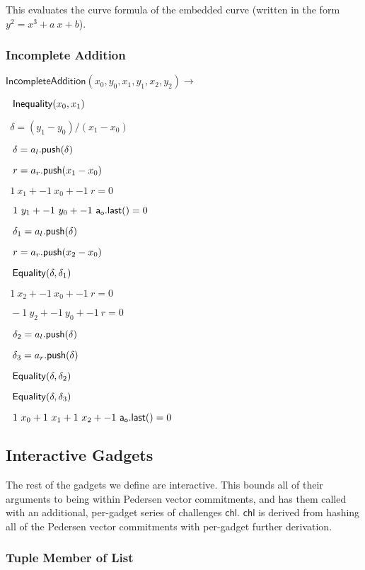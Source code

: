 \documentclass[]{article}
\begin{document}
This evaluates the curve formula of the embedded curve (written in the form $y^2 = x^3 + a ~x + b$).

\newpage

\subsubsection{Incomplete Addition}

\newcommand{\incompleteadd}{\mathsf{IncompleteAddition}}

$\incompleteadd(x_0, y_0, x_1, y_1, x_2, y_2) \rightarrow$

$~~\mathsf{Inequality}(x_0, x_1)$

$~~\delta = (y_1 - y_0) / (x_1 - x_0)$

$~~\delta = a_l\mathsf{.push}(\delta)$

$~~r = a_r\mathsf{.push}(x_1 - x_0)$

$~~1 ~x_1 + -1 ~x_0 + -1 ~r = 0$

$~~1 ~y_1 + -1 ~y_0 + -1 ~\mathsf{a_o.last()} = 0$

$~~\delta_1 = a_l\mathsf{.push}(\delta)$

$~~r = a_r\mathsf{.push}(x_2 - x_0)$

$~~\mathsf{Equality}(\delta, \delta_1)$

$~~1 ~x_2 + -1 ~x_0 + -1 ~r = 0$

$~~-1 ~y_2 + -1 ~y_0 + -1 ~r = 0$

$~~\delta_2 = a_l\mathsf{.push}(\delta)$

$~~\delta_3 = a_r\mathsf{.push}(\delta)$

$~~\mathsf{Equality}(\delta, \delta_2)$

$~~\mathsf{Equality}(\delta, \delta_3)$

$~~1 ~x_0 + 1 ~x_1 + 1 ~x_2 + -1 ~\mathsf{a_o.last()} = 0$

\newpage

\subsection{Interactive Gadgets}

\newcommand{\chl}{\mathsf{chl}}

The rest of the gadgets we define are interactive. This bounds all of their arguments to being within Pedersen vector commitments, and has them called with an additional, per-gadget series of challenges $\chl$. $\chl$ is derived from hashing all of the Pedersen vector commitments with per-gadget further derivation.

\subsubsection{Tuple Member of List}
\end{document}
